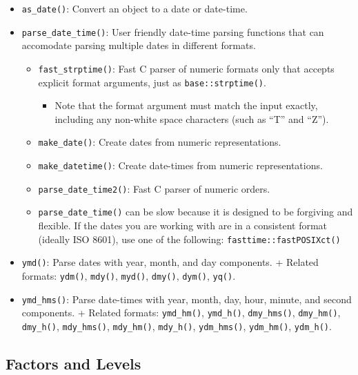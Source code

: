 \documentclass[]{book}
\providecommand{\tightlist}{%
  \setlength{\itemsep}{0pt}\setlength{\parskip}{0pt}}
\begin{document}
\begin{itemize}
\tightlist
\item
  \texttt{as\_date()}: Convert an object to a date or date-time.
\item
  \texttt{parse\_date\_time()}: User friendly date-time parsing functions that can accomodate parsing multiple dates in different formats.

  \begin{itemize}
  \tightlist
  \item
    \texttt{fast\_strptime()}: Fast C parser of numeric formats only that accepts explicit format arguments, just as \texttt{base::strptime()}.

    \begin{itemize}
    \tightlist
    \item
      Note that the format argument must match the input exactly, including any non-white space characters (such as ``T'' and ``Z'').
    \end{itemize}
  \item
    \texttt{make\_date()}: Create dates from numeric representations.
  \item
    \texttt{make\_datetime()}: Create date-times from numeric representations.
  \item
    \texttt{parse\_date\_time2()}: Fast C parser of numeric orders.
  \item
    \texttt{parse\_date\_time()} can be slow because it is designed to be forgiving and flexible. If the dates you are working with are in a consistent format (ideally ISO 8601), use one of the following: \texttt{fasttime::fastPOSIXct()}
  \end{itemize}
\item
  \texttt{ymd()}: Parse dates with year, month, and day components.
  + Related formats: \texttt{ydm()}, \texttt{mdy()}, \texttt{myd()}, \texttt{dmy()}, \texttt{dym()}, \texttt{yq()}.
\item
  \texttt{ymd\_hms()}: Parse date-times with year, month, day, hour, minute, and second components.
  + Related formats: \texttt{ymd\_hm()}, \texttt{ymd\_h()}, \texttt{dmy\_hms()}, \texttt{dmy\_hm()}, \texttt{dmy\_h()}, \texttt{mdy\_hms()}, \texttt{mdy\_hm()}, \texttt{mdy\_h()}, \texttt{ydm\_hms()}, \texttt{ydm\_hm()}, \texttt{ydm\_h()}.
\end{itemize}

\hypertarget{factors-and-levels}{%
\subsection{Factors and Levels}\label{factors-and-levels}}
\end{document}
